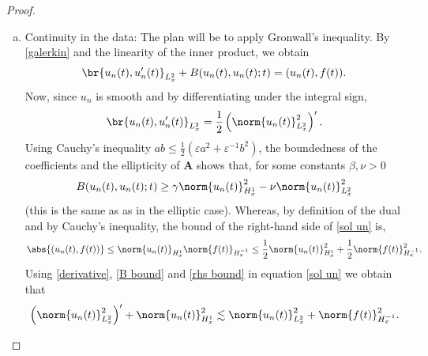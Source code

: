 \documentclass[
    a4paper,
    DIV=14,
    abstract=true,
    numbers=noenddot
]{scrartcl}
\begin{document}
\begin{proof}
\begin{enumerate}[a)]
 Since $\phi _i \in C_c^\infty(U)$, by the boundedness of the coefficients in Assumption \ref{ass}, and by the construction of $\bm{B}_n,\bm{f}_n$. It holds that $\bm{B}_n \in L^\infty_t$ and $\bm{f}_n \in L^2_t$. As a result, according to standard ODE theory, there exists a unique continuous solution $\bm{\lambda }$ to \eqref{galerkin 2}. One can even write out the explicit expression for $\bm{\lambda }$ using Duhamel's formula,
       \begin{align}\label{duhamel}
         \bm{\lambda}_n(t) = e^{\int_0^t \bm{B}_n(s) \d s } \bm{g}_n + \int_0^t e^{ \int_{s}^t \bm{B}_n(r) \d r} \bm{f}_n(s) \d s.
       \end{align}
 This proves existence.
    \item Continuity in the data: The plan will be to apply Gronwall's inequality. By \eqref{galerkin} and the linearity of the inner product, we obtain
       \begin{align}\label{sol un}
         \br{u_n(t),u_n'(t)}_{L^2_x}+B(u_n(t),u_n(t);t) = (u_n(t), f(t)).
       \end{align}
 Now, since $u_n$ is smooth and by differentiating under the integral sign,
       \begin{align}\label{derivative}
         \br{u_n(t),u_n'(t)}_{L^2_x} = \frac{1}{2}\left(\norm{u_n(t)}_{L_x^2}^2\right)'.
       \end{align}
 Using Cauchy's inequality $ab \leq \frac{1}{2} (\varepsilon a^2+\varepsilon^{-1} b^2)$, the boundedness of the coefficients and the ellipticity of $\bm{A}$ shows that, for some constants $\beta , \nu >0$
       \begin{align}\label{B bound}
 B(u_n(t),u_n(t);t) \geq \gamma \norm{u_n(t)}_{H^1_x}^2 - \nu\norm{u_n(t)}_{L^2_x}^2
       \end{align}
 (this is the same as  as in the elliptic case).
 Whereas, by definition of the dual and by Cauchy's inequality, the bound of the right-hand side of \eqref{sol un} is,
       \begin{align}\label{rhs bound}
         \abs{(u_n(t), f(t))} \leq \norm{u_n(t)}_{H_{x}^1} \norm{f(t)}_{H_x^{-1}}\leq \frac{1}{2} \norm{u_n(t)}_{H_{x}^1}^2 + \frac{1}{2} \norm{f(t)}_{H_x^{-1}}^2.
       \end{align}
 Using \eqref{derivative}, \eqref{B bound} and \eqref{rhs bound} in equation \eqref{sol un} we obtain that
       \begin{align}\label{i0}
         \left(\norm{u_n(t)}_{L_x^2}^2\right)' + \norm{u_n(t)}_{H^1_x}^2 \lesssim \norm{u_n(t)}^2_{L_x^2} + \norm{f(t)}_{ H_x^{-1}}^2.

\end{align}
\end{enumerate}
\end{proof}
\end{document}
